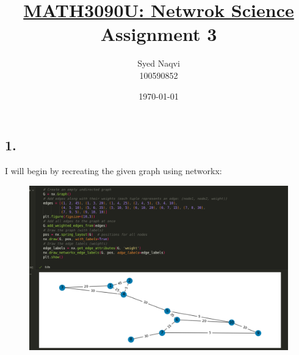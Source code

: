 \documentclass{article}
\title{\textbf{\underline{MATH3090U: Netwrok Science}\\Assignment 3}}
\author{Syed Naqvi\\100590852}
\date{\today}
\begin{document}
    \maketitle
    
    \subsection*{1.}
    
    \begin{center}
        \begin{minipage}[t]{0.9\textwidth}
            I will begin by recreating the given graph using networkx:
            \begin{figure}[H]
                \centering
                \includegraphics[width=1\textwidth, height=0.5\textheight]{./1.png}
            \end{figure}
        \end{minipage}
    \end{center}
\end{document}
